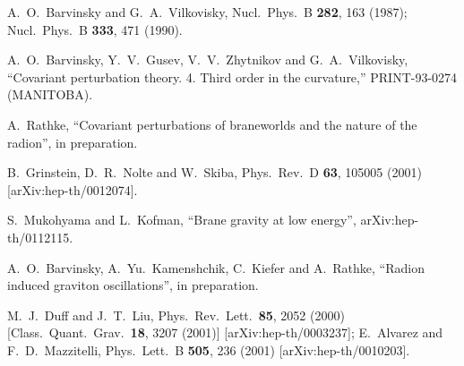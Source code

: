 \documentclass[a4paper,preprint,nofootinbib,
                 showpacs,preprintnumbers,amsmath,amssymb]{revtex4}
\begin{document}
\begin{thebibliography}{99}
% 
% 
% 
% 
 
A.~O.~Barvinsky and G.~A.~Vilkovisky, 
Nucl.\ Phys.\ B {\bf 282}, 163 (1987); 
Nucl.\ Phys.\ B {\bf 333}, 471 (1990). 
 
 A.~O.~Barvinsky, Y.~V.~Gusev, V.~V.~Zhytnikov and G.~A.~Vilkovisky, 
``Covariant perturbation theory. 4. Third order in the curvature,'' 
PRINT-93-0274 (MANITOBA). 
 
A.~Rathke,
``Covariant perturbations of braneworlds and the nature of the radion'',
in preparation. 
 
B.~Grinstein, D.~R.~Nolte and W.~Skiba, 
Phys.\ Rev.\ D {\bf 63}, 105005 (2001) 
[arXiv:hep-th/0012074]. 
 
S.~Mukohyama and L.~Kofman, ``Brane gravity at low energy'', 
arXiv:hep-th/0112115. 
 
A.~O.~Barvinsky, A.~Yu.~Kamenshchik, C.~Kiefer 
    and A.~Rathke, ``Radion induced graviton oscillations'', in preparation. 
 

M.~J.~Duff and J.~T.~Liu, 
Phys.\ Rev.\ Lett.\  {\bf 85}, 2052 (2000) 
[Class.\ Quant.\ Grav.\  {\bf 18}, 3207 (2001)] 
[arXiv:hep-th/0003237]; 
E.~Alvarez and F.~D.~Mazzitelli, 
Phys.\ Lett.\ B {\bf 505}, 236 (2001) 
[arXiv:hep-th/0010203]. 
 

\end{thebibliography}
\end{document}
